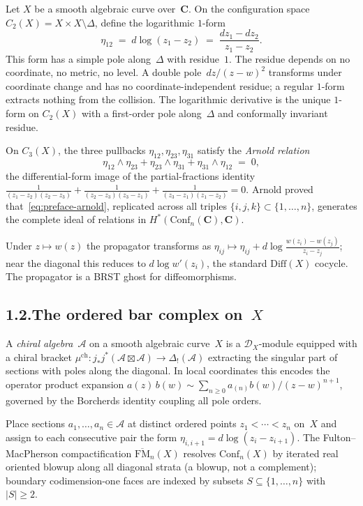 \documentclass[11pt,reqno]{amsart}
\theoremstyle{definition}
\theoremstyle{remark}
\providecommand{\cA}{\mathcal{A}}
\numberwithin{equation}{section}
\begin{document}
Let $X$ be a smooth algebraic curve over~$\mathbf C$. On the
configuration space $C_2(X)=X\times X\setminus\Delta$, define the
logarithmic $1$-form
\begin{equation}\label{eq:preface-eta}
\eta_{12}\;=\;d\log(z_1-z_2)\;=\;\frac{dz_1-dz_2}{z_1-z_2}.
\end{equation}
This form has a simple pole along~$\Delta$ with residue~$1$. The
residue depends on no coordinate, no metric, no level. A double
pole~$dz/(z-w)^2$ transforms under coordinate change and has no
coordinate-independent residue; a regular $1$-form extracts nothing
from the collision. The logarithmic derivative is the unique $1$-form
on $C_2(X)$ with a first-order pole along~$\Delta$ and conformally
invariant residue.

On $C_3(X)$, the three pullbacks $\eta_{12}, \eta_{23}, \eta_{31}$
satisfy the \emph{Arnold relation}
\begin{equation}\label{eq:preface-arnold}
\eta_{12}\wedge\eta_{23}+\eta_{23}\wedge\eta_{31}+\eta_{31}\wedge\eta_{12}\;=\;0,
\end{equation}
the differential-form image of the partial-fractions identity
$\tfrac{1}{(z_1-z_2)(z_2-z_3)}+\tfrac{1}{(z_2-z_3)(z_3-z_1)}+\tfrac{1}{(z_3-z_1)(z_1-z_2)}=0$.
Arnold proved that~\eqref{eq:preface-arnold}, replicated across all
triples $\{i,j,k\}\subset\{1,\ldots,n\}$, generates the complete ideal
of relations in $H^*(\mathrm{Conf}_n(\mathbf C),\mathbf C)$.

Under $z\mapsto w(z)$ the propagator transforms as
$\eta_{ij}\mapsto\eta_{ij}+d\log\frac{w(z_i)-w(z_j)}{z_i-z_j}$;
near the diagonal this reduces to $d\log w'(z_i)$, the standard
$\mathrm{Diff}(X)$ cocycle. The propagator is a BRST ghost for
diffeomorphisms.

\subsection*{1.2.\enspace The ordered bar complex on~$X$}

A \emph{chiral algebra}~$\cA$ on a smooth algebraic curve~$X$ is a
$\mathcal D_X$-module equipped with a chiral bracket
$\mu^{\mathrm{ch}}\colon j_*j^*(\cA\boxtimes\cA)\to\Delta_!(\cA)$
extracting the singular part of sections with poles along the diagonal.
In local coordinates this encodes the operator product expansion
$a(z)\,b(w)\sim\sum_{n\ge 0}a_{(n)}b(w)/(z-w)^{n+1}$,
governed by the Borcherds identity coupling all pole orders.

Place sections $a_1,\dots,a_n\in\cA$ at distinct ordered points
$z_1<\cdots<z_n$ on~$X$ and assign to each consecutive pair
the form $\eta_{i,i+1}=d\log(z_i-z_{i+1})$. The
Fulton--MacPherson compactification
$\overline{\mathrm{FM}}_n(X)$ resolves $\mathrm{Conf}_n(X)$ by
iterated real oriented blowup along all diagonal strata (a blowup,
not a complement); boundary codimension-one faces are indexed by
subsets $S\subseteq\{1,\ldots,n\}$ with $|S|\ge 2$.
\end{document}
